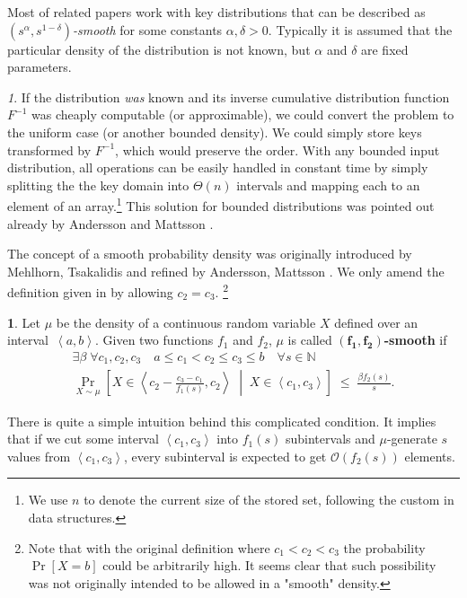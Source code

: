 \documentclass[
submission
]{dmtcs-episciences}
\theoremstyle{plain}
\theoremstyle{definition}
\newtheorem{defn}[thm]{\protect\definitionname}
\theoremstyle{remark}
\newtheorem*{rem*}{\protect\remarkname}
\theoremstyle{plain}
\theoremstyle{plain}
\providecommand{\definitionname}{Definition}
\providecommand{\remarkname}{Remark}
\def\interval#1#2{\left\langle#1,#2\right\rangle}
\def\lespaces{\;\le\;}
\def\Prob#1{\Pr\!\left[#1\right]}
\def\ProbParam#1#2{\Pr_{#1}\!\left[#2\right]}
\def\OO{\mathcal O}
\def\natural{\mathbb{N}}
\def\emphDef#1{{\bf#1}}
\def\emphDefMath#1{\mathbf{#1}}
\begin{document}
Most of related papers work with key distributions that can be described
as \emph{$\left(s^{\alpha},s^{1-\delta}\right)$-smooth} for some
constants $\alpha,\delta>0$. Typically it is assumed that the particular
density of the distribution is not known, but $\alpha$ and $\delta$
are fixed parameters.
\begin{rem*}
If the distribution \emph{was} known and its inverse cumulative distribution
function $F^{-1}$ was cheaply computable (or approximable), we could
convert the problem to the uniform case (or another bounded density).
We could simply store keys transformed by $F^{-1}$, which would preserve
the order. With any bounded input distribution, all operations can
be easily handled in constant time by simply splitting the the key
domain into $\Theta(n)$ intervals and mapping each to an element
of an array.\footnote{We use $n$ to denote the current size of the stored set, following
the custom in data structures.} This solution for bounded distributions was pointed out already by
Andersson and Mattsson \cite[sec. 5.2]{AndersM93}.
\end{rem*}
The concept of a smooth probability density was originally introduced by Mehlhorn, Tsakalidis \cite{MehlT93} and refined by Andersson, Mattsson \cite{AndersM93}. We only amend the definition given in \cite{AndersM93,KMSTTZ06} by allowing $c_2 = c_3$.%
	\footnote{
		Note that with the original definition where $c_1 < c_2 < c_3$ the probability $\Prob{X = b}$ could be arbitrarily high.
		It seems clear that such possibility was not originally intended to be allowed in a "smooth" density.
		}
\begin{defn}%
 \label{def:smooth}
	Let $\mu$ be the density of a continuous random variable $X$ defined over an interval~$\interval a b$. Given two functions $f_1$ and $f_2$, $\mu$ is called \emphDef{$\emphDefMath{(f_1,f_2)}$-smooth} if
	\begin{multline*}
		\exists\beta \; \forall c_1,c_2,c_3 \quad a \le c_1 < c_2 \le c_3 \le b \quad \forall s \in \natural \\
		\ProbParam{X \sim \mu}{  X \in \interval{ c_2 - \frac{c_3-c_1}{f_1(s)} }{c_2} \; \middle| \; X \in \interval{c_1}{c_3}  }
		\lespaces \frac{\beta f_2(s)}{s}.
	\end{multline*}
\end{defn}

There is quite a simple intuition behind this complicated condition. It implies that if we cut some interval $\interval{c_1}{c_3}$ into $f_1(s)$ subintervals and $\mu$-generate $s$ values from $\interval{c_1}{c_3}$, every subinterval is expected to get $\OO(f_2(s))$ elements.
\end{document}
